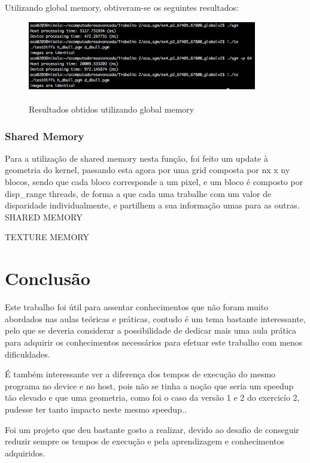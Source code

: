 \documentclass[pdftex,12pt,a4paper]{report}
\begin{document}
Utilizando global memory, obtiveram-se os seguintes resultados:

\begin{figure}[!htb]
\center
 \includegraphics[width=100mm,scale=1]{CreateDisparityGlobal.png}
 \caption{\\ Resultados obtidos utilizando global memory}
 \label{fig:CreateDisparityGlobal}
\end{figure}

\subsubsection{Shared Memory}

Para a utilização de shared memory nesta função, foi feito um update à geometria do kernel, passando esta agora por uma grid composta por nx x ny blocos, sendo que cada bloco corresponde a um pixel, e um bloco é composto por disp\_range threads, de forma a que cada uma trabalhe com um valor de disparidade individualmente, e partilhem a sua informação umas para as outras.
SHARED MEMORY

TEXTURE MEMORY
\newpage
\section{Conclusão}

Este trabalho foi útil para assentar conhecimentos que não foram muito abordados nas aulas teóricas e práticas, contudo é um tema bastante interessante, pelo que se deveria considerar a possibilidade de dedicar mais uma aula prática para adquirir os conhecimentos necessários para efetuar este trabalho com menos dificuldades.

É também interessante ver a diferença dos tempos de execução do mesmo programa no device e no host, pois não se tinha a noção que seria um speedup tão elevado e que uma geometria, como foi o caso da versão 1 e 2 do exercicío 2, pudesse ter tanto impacto neste mesmo speedup.. 

Foi um projeto que deu bastante gosto a realizar, devido ao desafio de conseguir reduzir sempre os tempos de execução e pela aprendizagem e conhecimentos adquiridos.
\end{document}
